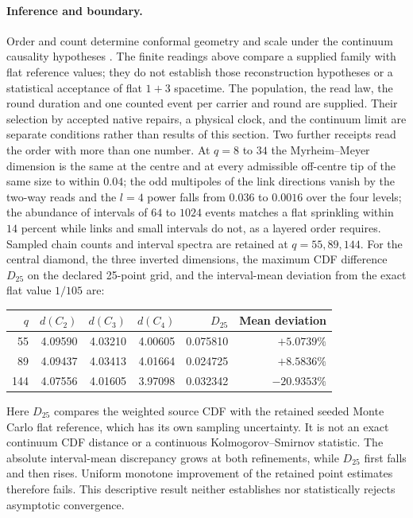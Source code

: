 \paragraph{Inference and boundary.}
Order and count determine conformal geometry and scale under the continuum
causality hypotheses \cite{hawkingkingmccarthy1976,malament1977}.
The finite readings above compare a supplied family with flat reference
values; they do not establish those reconstruction hypotheses or a
statistical acceptance of flat $1+3$ spacetime.
The population, the read law, the round duration and one counted event per
carrier and round are supplied. Their selection by accepted native repairs,
a physical clock, and the continuum limit are separate conditions rather than
results of this section. Two further receipts read the order with more than
one number. At $q=8$ to $34$ the Myrheim--Meyer dimension is the same at the
centre and at every admissible off-centre tip of the same size to within
$0.04$; the odd multipoles of the link directions vanish by the two-way reads
and the $l=4$ power falls from $0.036$ to $0.0016$ over the four levels; the
abundance of intervals of $64$ to $1024$ events matches a flat sprinkling
within $14$ percent while links and small intervals do not, as a layered order
requires. Sampled chain counts and interval spectra are retained at
$q=55,89,144$. For the central diamond, the three inverted dimensions,
the maximum CDF difference $D_{25}$ on the declared 25-point grid, and
the interval-mean deviation from the exact flat value $1/105$ are:
\begin{center}
\begingroup
\setlength{\tabcolsep}{6pt}
\renewcommand{\arraystretch}{1.15}
\begin{tabular}{r rrr rr}
$q$ & $d(C_2)$ & $d(C_3)$ & $d(C_4)$ & $D_{25}$ & Mean deviation\\\hline
55 & 4.09590 & 4.03210 & 4.00605 & 0.075810 & $+5.0739\%$\\
89 & 4.09437 & 4.03413 & 4.01664 & 0.024725 & $+8.5836\%$\\
144 & 4.07556 & 4.01605 & 3.97098 & 0.032342 & $-20.9353\%$
\end{tabular}
\endgroup
\end{center}
Here $D_{25}$ compares the weighted source CDF with the retained seeded
Monte Carlo flat reference, which has its own sampling uncertainty.
It is not an exact continuum CDF distance or a continuous
Kolmogorov--Smirnov statistic. The absolute interval-mean discrepancy grows
at both refinements, while $D_{25}$ first falls and then rises. Uniform
monotone improvement of the retained point estimates therefore fails.
This descriptive result neither establishes nor statistically rejects
asymptotic convergence.

